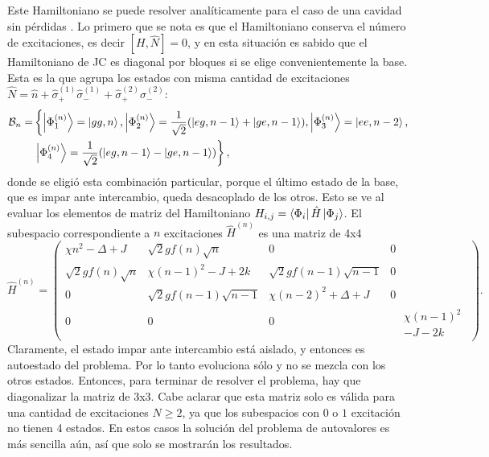 Este Hamiltoniano se puede resolver analíticamente para el caso de una cavidad sin pérdidas \cite{Santos2016}. Lo primero que se nota es que el Hamiltoniano conserva el número de excitaciones, es decir $[H,\hat N]=0$, y en esta situación es sabido que el Hamiltoniano de JC es diagonal por bloques si se elige convenientemente la base. Esta es la que agrupa los estados con misma cantidad de excitaciones $\hat N = \hat n + \hat \sigma_+^{(1)}\hat \sigma_-^{(1)}+\hat \sigma_+^{(2)}\hat \sigma_-^{(2)}$: 
\begin{equation}
\begin{split}
    \mathcal{B}_n=& \left\{\ket{\Phi^{(n)}_1}=\ket{gg,n},\ket{\Phi^{(n)}_2}=\frac{1}{\sqrt{2}}(\ket{eg,n-1}+\ket{ge,n-1}),\ket{\Phi^{(n)}_3}=\ket{ee,n-2},\right. \\
& \left. \ket{\Phi^{(n)}_4}=\frac{1}{\sqrt{2}}(\ket{eg,n-1}-\ket{ge,n-1})\right\} ,
\end{split}
\label{ec4:base}
\end{equation}
donde se eligi\'o esta combinaci\'on particular, porque el último estado de la base, que es impar ante intercambio, queda desacoplado de los otros. Esto se ve al evaluar los elementos de matriz del Hamiltoniano $H_{i,j}=\bra{\Phi_i}\hat H \ket{\Phi_j}$. El subespacio correspondiente a $n$ excitaciones $\hat H^{(n)}$ es una matriz de 4x4
\begin{equation}
    \hat H^{(n)}=
    \begin{pmatrix}
     \chi n^2 - \Delta +  J & \sqrt{2} g f(n)\sqrt{n} & 0 & 0 \\
    \sqrt{2} g f(n)\sqrt{n} &  \chi (n-1)^2  -  J + 2 k & \sqrt{2} g f(n-1)\sqrt{n-1} & 0 \\
    0 & \sqrt{2} g f(n-1)\sqrt{n-1} &  \chi (n-2)^2 +  \Delta +  J & 0 \\
    0&0&0& \begin{aligned} 
                 & \chi (n-1)^2  \\ 
                 &-  J - 2 k
        \end{aligned}
    \end{pmatrix}.
\end{equation}
Claramente, el estado impar ante intercambio está aislado, y entonces es autoestado del problema. Por lo tanto evoluciona sólo y no se mezcla con los otros estados. Entonces, para terminar de resolver el problema, hay que diagonalizar la matriz de 3x3. Cabe aclarar que esta matriz solo es válida para una cantidad de excitaciones $N\geq 2$, ya que los subespacios con $0$ o $1$ excitación no tienen 4 estados. En estos casos la soluci\'on del problema de autovalores es más sencilla aún, as\'i que solo se mostrarán los resultados. \newline
